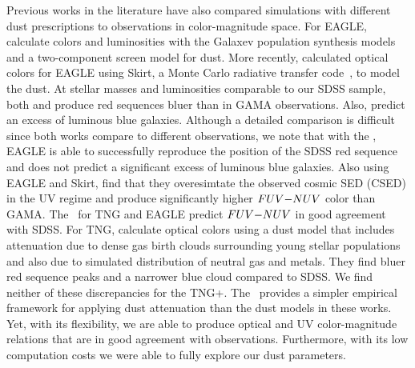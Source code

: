 Previous works in the literature have also compared simulations with different
dust prescriptions to observations in color-magnitude space. For EAGLE, 
\cite{trayford2015} calculate colors and luminosities with the {\sc Galaxev}
population synthesis models and a two-component screen model for dust. More
recently, \cite{trayford2017} calculated optical colors for EAGLE using {\sc
Skirt}, a Monte Carlo radiative transfer code~\citep{camps2015}, to model the
dust. At stellar masses and luminosities comparable to our SDSS sample, both 
\cite{trayford2015} and \cite{trayford2017} produce red sequences bluer than 
in GAMA observations. Also, \cite{trayford2015} predict an excess of luminous 
blue galaxies. Although a detailed comparison is difficult since both works 
compare to different observations, we note that with the \eda, EAGLE is able 
to successfully reproduce the position of the SDSS red sequence and does not 
predict a significant excess of luminous blue galaxies. Also using EAGLE and 
{\sc Skirt}, \cite{baes2019} find that they overesimtate the observed cosmic 
SED (CSED) in the UV regime and produce significantly higher $FUV{-}NUV$ color 
than GAMA. The \eda~for TNG and EAGLE predict $FUV{-}NUV$ in good agreement with
SDSS. 
For TNG, \cite{nelson2018} calculate optical colors using a dust model that
includes attenuation due to dense gas birth clouds surrounding young stellar
populations and also due to simulated distribution of neutral gas and metals.
They find bluer red sequence peaks and a narrower blue cloud compared to SDSS.
We find neither of these discrepancies for the TNG+\eda. The \eda~provides a
simpler empirical framework for applying dust attenuation than the dust models
in these works. Yet, with its flexibility, we are able to produce optical and
UV color-magnitude relations that are in good agreement with observations.
Furthermore, with its low computation costs we were able to fully
explore our dust parameters. 

 

 






